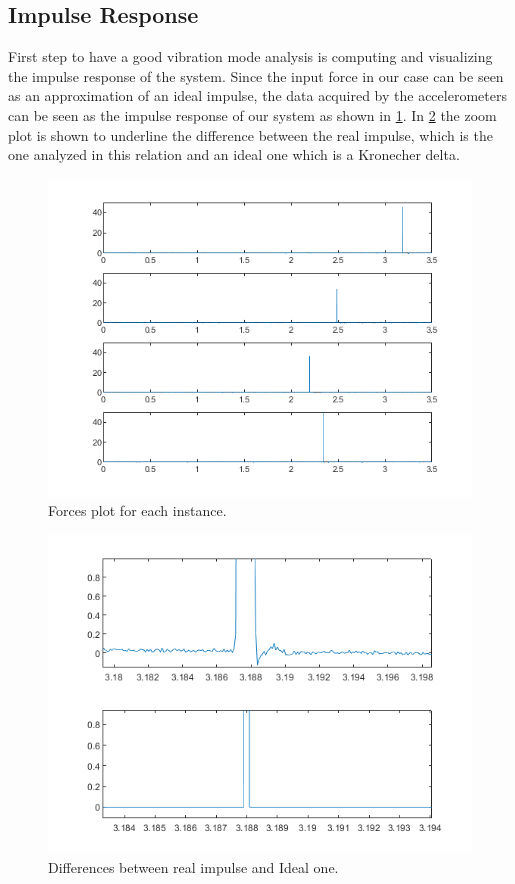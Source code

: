 \documentclass[12pt,a4paper,twoside]{article}
\begin{document}
\subsection{Impulse Response}
First step to have a good vibration mode analysis is computing and visualizing the impulse response of the system. Since the input force in our case can be seen as an approximation of an ideal impulse, the data acquired by the accelerometers can be seen as the impulse response of our system as shown in \figurename{ \ref{forces}}. In \figurename{ \ref{forcespart}} the zoom plot is shown to underline the difference between the real impulse, which is the one analyzed in this relation and an ideal one which is a Kronecher delta.\\

\begin{figure}[h!]
	\centering
	\includegraphics[width=0.9\linewidth]{Images/forces.png}
	\caption{Forces plot for each instance.}
	\label{forces}
\end{figure}
\noindent

\begin{figure}[h!]
	\centering
	\includegraphics[width=0.9\linewidth]{Images/delta.png}
	\caption{Differences between real impulse and Ideal one.}
	\label{forcespart}
\end{figure}
\noindent
\end{document}
